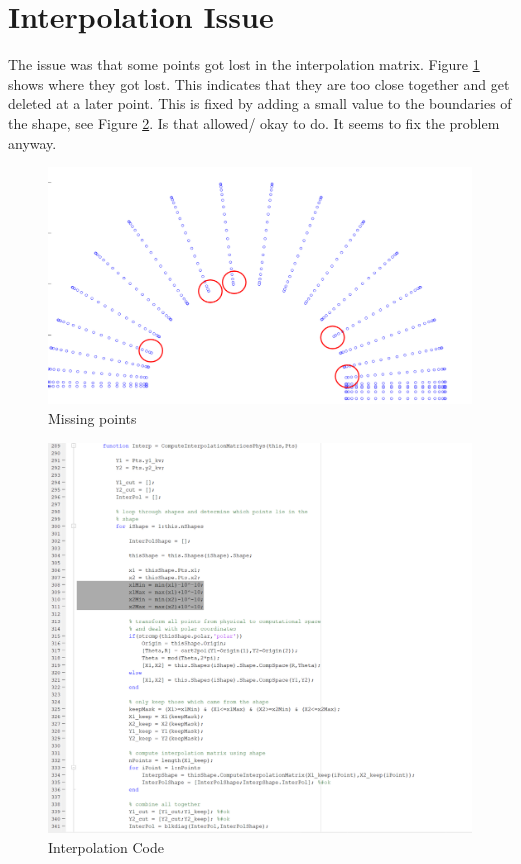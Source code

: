 \documentclass[11pt, a4paper]{article}
\theoremstyle{definition}
\begin{document}
	\section{Interpolation Issue}
	The issue was that some points got lost in the interpolation matrix. Figure \ref{FPts} shows where they got lost. This indicates that they are too close together and get deleted at a later point. This is fixed by adding a small value to the boundaries of the shape, see Figure \ref{FBound}. Is that allowed/ okay to do. It seems to fix the problem anyway.
		\begin{figure}[h]
		\centering
		\includegraphics[scale=0.6]{Screenshot1.png}
		\caption{Missing points} 
		\label{FPts}
	\end{figure}
	\begin{figure}[h]
		\centering
		\includegraphics[scale=0.6]{InterpolatePhys.png}
		\caption{Interpolation Code} 
		\label{FBound}
	\end{figure}
	
\end{document}
